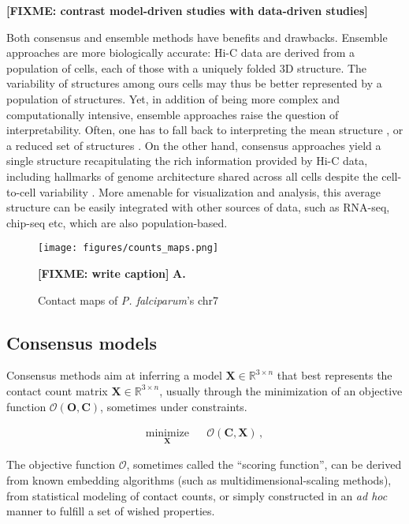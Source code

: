 \documentclass[letterpaper,12pt]{article}
\newcommand{\fixme}[1]{\textbf{[FIXME: #1]}}
\newcommand{\Xb}{\textbf{X}}
\newcommand{\RR}{\mathbb{R}}
\begin{document}
\fixme{contrast model-driven studies with data-driven studies}

Both consensus and ensemble methods have benefits and drawbacks. Ensemble
approaches are more biologically accurate: Hi-C data are derived from a
population of cells, each of those with a uniquely folded 3D structure. The
variability of structures among ours cells may thus be better represented by a
population of structures. Yet, in addition of being more complex and
computationally intensive, ensemble approaches raise the question of
interpretability. Often, one has to fall back to interpreting the mean
structure \citep{kalhor:genome}, or a reduced set of structures
\citep{rousseau:three}. On the other hand, consensus approaches yield a single
structure recapitulating the rich information provided by Hi-C data, including
hallmarks of genome architecture shared across all cells despite the
cell-to-cell variability \citet{nagano:single-cell}. More amenable for
visualization and analysis, this average structure can be easily integrated
with other sources of data, such as RNA-seq, chip-seq etc, which are also
population-based.


\begin{figure}
\centering
\texttt{[image: figures/counts\_maps.png]}
\caption{Contact maps of {\em P. falciparum}'s chr7}{
\fixme{write caption}
\textbf{A.} \citep{lemieux:genome-wide}}
\label{Fig1}
\end{figure}

\subsection*{Consensus models}

Consensus methods aim at inferring a model $\mathbf{X} \in \RR^{3 \times n}$
that best represents the contact count matrix $\mathbf{X} \in \RR^{3 \times
n}$, usually through the minimization of an objective function
$\mathcal{O}(\mathbf{O}, \mathbf{C})$, sometimes under constraints.

\begin{equation*}
\renewcommand{\arraystretch}{2}
\begin{array}{ccl}
\underset{\Xb}{\text{minimize}} & & \mathcal{O}(\mathbf{C}, \Xb) \,,
\end{array}
\end{equation*}

The objective function $\mathcal{O}$, sometimes called the ``scoring
function'', can be derived from known embedding algorithms (such as
multidimensional-scaling methods), from statistical modeling of contact
counts, or simply constructed in an \textit{ad hoc} manner to fulfill a set of
wished properties.
\end{document}
